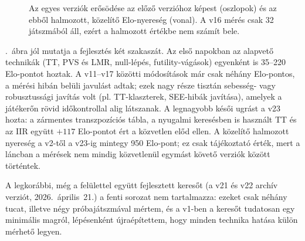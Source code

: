 \begin{figure}[!ht]
	\centering
	\caption{Az egyes verziók erősödése az előző verzióhoz képest (oszlopok) és az ebből halmozott, közelítő Elo-nyereség (vonal). A v16 mérés csak 32 játszmából áll, ezért a halmozott értékbe nem számít bele.}
	\label{fig:versions}
\end{figure}

.~ábra jól mutatja a fejlesztés két szakaszát. Az első napokban az alapvető technikák (TT, PVS és LMR, null-lépés, futility-vágások) egyenként is 35--220 Elo-pontot hoztak. A v11--v17 közötti módosítások már csak néhány Elo-pontos, a mérési hibán belüli javulást adtak; ezek nagy része tisztán sebesség- vagy robusztussági javítás volt (pl. TT-klaszterek, SEE-hibák javítása), amelyek a játékerőn rövid időkontrollal alig látszanak. A legnagyobb késői ugrást a v23 hozta: a zármentes transzpozíciós tábla, a nyugalmi keresésben is használt TT és az IIR együtt $+117$ Elo-pontot ért a közvetlen előd ellen. A közelítő halmozott nyereség a v2-től a v23-ig mintegy 950 Elo-pont; ez csak tájékoztató érték, mert a láncban a mérések nem mindig közvetlenül egymást követő verziók között történtek.

A legkorábbi, még a felülettel együtt fejlesztett keresőt (a v21 és v22 archív verziót, 2026.~április~21.) a fenti sorozat nem tartalmazza: ezeket csak néhány tucat, illetve négy próbajátszmával mértem, és a v1-ben a keresőt tudatosan egy minimális magról, lépésenként újraépítettem, hogy minden technika hatása külön mérhető legyen.
